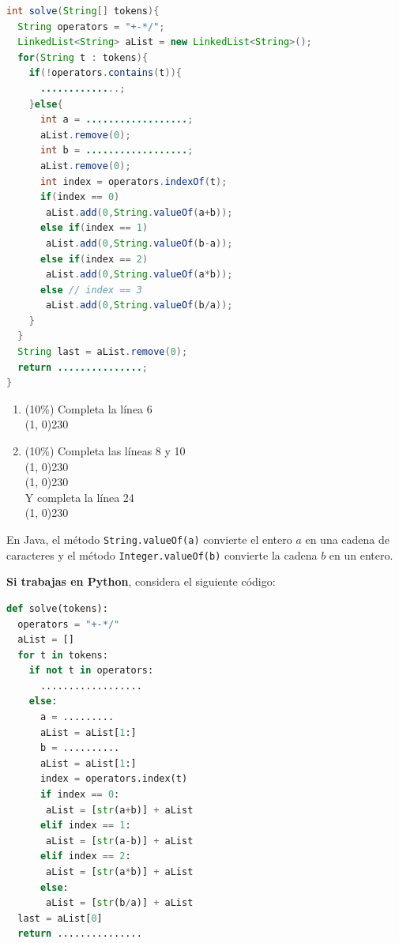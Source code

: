 \documentclass[10 pt]{article}
\begin{document}
\begin{lstlisting}[language = Java]
int solve(String[] tokens){
  String operators = "+-*/";
  LinkedList<String> aList = new LinkedList<String>();
  for(String t : tokens){
    if(!operators.contains(t)){
      ..............;
    }else{
      int a = ..................;
      aList.remove(0);
      int b = ..................;
      aList.remove(0);
      int index = operators.indexOf(t);
      if(index == 0) 
       aList.add(0,String.valueOf(a+b));
      else if(index == 1)
       aList.add(0,String.valueOf(b-a));
      else if(index == 2)
       aList.add(0,String.valueOf(a*b));
      else // index == 3
       aList.add(0,String.valueOf(b/a));
    }
  }
  String last = aList.remove(0);
  return ...............;
}
\end{lstlisting}
\begin{enumerate}[label=(\Alph*)]
 
  \item (10\%) Completa la línea 6\\
  \line(1, 0){230}\\
  \item (10\%) Completa las líneas 8 y 10\\
  \line(1, 0){230} \\
  \line(1, 0){230}\\
  Y completa la línea 24\\
  \line(1, 0){230}
\end{enumerate}

En Java, el método \texttt{String.valueOf(a)} convierte el entero $a$ en una cadena de caracteres y el método \texttt{Integer.valueOf(b)} convierte la cadena $b$ en un entero.

\newpage

\textbf{Si trabajas en Python}, considera el siguiente código:

\begin{lstlisting}[language = Python]
def solve(tokens):
  operators = "+-*/"
  aList = []
  for t in tokens:
    if not t in operators:
      ..................
    else:
      a = .........
      aList = aList[1:]
      b = ..........
      aList = aList[1:]
      index = operators.index(t)
      if index == 0:
       aList = [str(a+b)] + aList 
      elif index == 1:
       aList = [str(a-b)] + aList 
      elif index == 2:
       aList = [str(a*b)] + aList 
      else:
       aList = [str(b/a)] + aList 
  last = aList[0]
  return ...............
\end{lstlisting}
\end{document}
